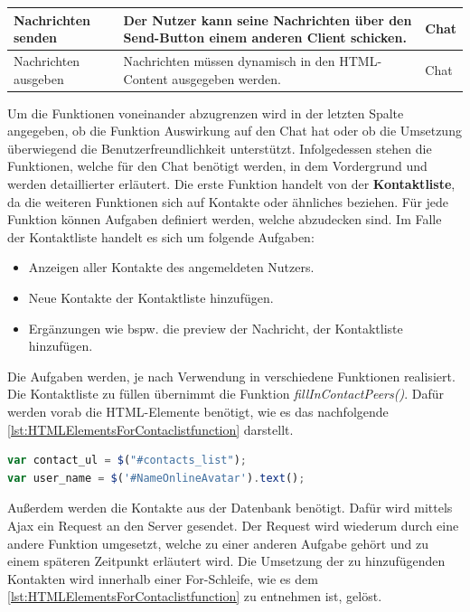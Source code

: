 \documentclass[a4paper,titlepage,halfparskip,12pt]{scrreprt}
\begin{document}
\begin{onehalfspacing}
\begin{table}[h]
\begin{tabular}{|p{2.5cm}|p{8.8cm}|p{3.5cm}|}
		\hline
		Nachrichten senden & Der Nutzer kann seine Nachrichten über den Send-Button einem anderen Client schicken. & Chat\\
		\hline
		Nachrichten ausgeben & Nachrichten müssen dynamisch in den \ac{HTML}-Content ausgegeben werden. & Chat\\
		\hline
	\end{tabular}
	\label{tab:JavaScript Aufgabendefinition für gochat.html}
\end{table}
Um die Funktionen voneinander abzugrenzen wird in der letzten Spalte angegeben, ob die Funktion Auswirkung auf den Chat hat oder ob die Umsetzung überwiegend die Benutzerfreundlichkeit unterstützt. Infolgedessen stehen die Funktionen, welche für den Chat benötigt werden, in dem Vordergrund und werden detaillierter erläutert. Die erste Funktion handelt von der \textbf{Kontaktliste}, da die weiteren Funktionen sich auf Kontakte oder ähnliches beziehen. Für jede Funktion können Aufgaben definiert werden, welche abzudecken sind. Im Falle der Kontaktliste handelt es sich um folgende Aufgaben:
\begin{itemize}
	\item Anzeigen aller Kontakte des angemeldeten Nutzers.
	\item Neue Kontakte der Kontaktliste hinzufügen.
	\item Ergänzungen wie bspw. die preview der Nachricht, der Kontaktliste hinzufügen.
\end{itemize}
Die Aufgaben werden, je nach Verwendung in verschiedene Funktionen realisiert. Die Kontaktliste zu füllen übernimmt die Funktion \textit{fillInContactPeers()}. Dafür werden vorab die \ac{HTML}-Elemente benötigt, wie es das nachfolgende \autoref{lst:HTMLElementsForContaclistfunction} darstellt.
\begin{lstlisting}[language=Javascript,caption=HTML Elemente für \textit{fillInContactPeers()},label={lst:HTMLElementsForContaclistfunction}]
var contact_ul = $("#contacts_list");
var user_name = $('#NameOnlineAvatar').text();
\end{lstlisting}
Außerdem werden die Kontakte aus der Datenbank benötigt. Dafür wird mittels Ajax ein Request an den Server %
gesendet. Der Request wird wiederum durch eine andere Funktion umgesetzt, welche zu einer anderen Aufgabe gehört und zu einem späteren Zeitpunkt erläutert wird. Die Umsetzung der zu hinzufügenden Kontakten wird innerhalb einer For-Schleife, wie es dem \autoref{lst:HTMLElementsForContaclistfunction} zu entnehmen ist, gelöst.
\begin{lstlisting}[language=Javascript,caption=HTML Elemente für \textit{fillInContactPeers()},label={lst:HTMLElementsForContaclistfunction}]

\end{lstlisting}
\end{onehalfspacing}
\end{document}

